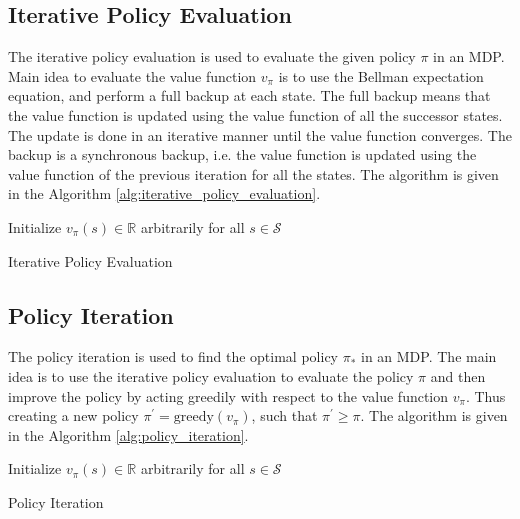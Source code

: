 \subsection{Iterative Policy Evaluation}
The iterative policy evaluation is used to evaluate the given policy \(\pi\) in an MDP. 
Main idea to evaluate the value function \(v_{\pi}\) is to use the Bellman expectation equation,
and perform a full backup at each state. The full backup means that the value function is updated
using the value function of all the successor states. The update is done in an iterative manner
until the value function converges. The backup is a synchronous backup, i.e. the value function
is updated using the value function of the previous iteration for all the states. The algorithm
is given in the Algorithm \autoref{alg:iterative_policy_evaluation}.


\begin{algorithm}[H]
    \SetAlgoLined
    Initialize \(v_{\pi}(s) \in \mathbb{R}\) arbitrarily for all \(s \in \mathcal{S}\) \;
    \caption{Iterative Policy Evaluation}
    \label{alg:iterative_policy_evaluation}
\end{algorithm}

\subsection{Policy Iteration}
The policy iteration is used to find the optimal policy \(\pi_{*}\) in an MDP. The main idea
is to use the iterative policy evaluation to evaluate the policy \(\pi\) and then improve the policy
by acting greedily with respect to the value function \(v_{\pi}\). Thus creating a new policy
\(\pi^{\prime}  = \text{greedy}(v_{\pi})\), such that \(\pi^{\prime} \geq \pi  \).  The algorithm is given in the Algorithm \autoref{alg:policy_iteration}.


\begin{algorithm}[H]
    \SetAlgoLined
    Initialize \(v_{\pi}(s) \in \mathbb{R}\) arbitrarily for all \(s \in \mathcal{S}\) \;
    \caption{Policy Iteration}
    \label{alg:policy_iteration}
\end{algorithm}


